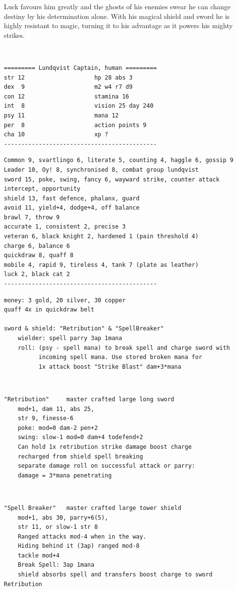 Luck favours him greatly and the ghosts of his enemies swear he can change destiny by his determination alone. With his magical shield and sword he is highly resistant to magic, turning it to his advantage as it powers his mighty strikes.


\

\goodbreak \small \begin{samepage} \begin{verbatim}
========= Lundqvist Captain, human =========
str 12                    hp 28 abs 3
dex  9                    m2 w4 r7 d9
con 12                    stamina 16
int  8                    vision 25 day 240
psy 11                    mana 12
per  8                    action points 9
cha 10                    xp ?
--------------------------------------------
\end{verbatim} \goodbreak \begin{verbatim}
Common 9, svartlingo 6, literate 5, counting 4, haggle 6, gossip 9
Leader 10, Oy! 8, synchronised 8, combat group lundqvist
sword 15, poke, swing, fancy 6, wayward strike, counter attack
intercept, opportunity
shield 13, fast defence, phalanx, guard
avoid 11, yield+4, dodge+4, off balance
brawl 7, throw 9
accurate 1, consistent 2, precise 3
veteran 6, black knight 2, hardened 1 (pain threshold 4)
charge 6, balance 6
quickdraw 8, quaff 8
mobile 4, rapid 9, tireless 4, tank 7 (plate as leather)
luck 2, black cat 2
--------------------------------------------
\end{verbatim} \goodbreak \begin{verbatim}
money: 3 gold, 20 silver, 30 copper
quaff 4x in quickdraw belt

sword & shield: "Retribution" & "SpellBreaker"
    wielder: spell parry 3ap 1mana
    roll: (psy - spell mana) to break spell and charge sword with
          incoming spell mana. Use stored broken mana for
          1x attack boost "Strike Blast" dam+3*mana
\end{verbatim} \end{samepage}   \   \goodbreak \begin{samepage} \begin{verbatim}
"Retribution"     master crafted large long sword
    mod+1, dam 11, abs 25,
    str 9, finesse-6
    poke: mod=0 dam-2 pen+2
    swing: slow-1 mod=0 dam+4 todefend+2
    Can hold 1x retribution strike damage boost charge
    recharged from shield spell breaking
    separate damage roll on successful attack or parry:
    damage = 3*mana penetrating
\end{verbatim} \end{samepage}   \   \goodbreak \begin{samepage} \begin{verbatim}
"Spell Breaker"   master crafted large tower shield
    mod+1, abs 30, parry+6(5),
    str 11, or slow-1 str 8
    Ranged attacks mod-4 when in the way.
    Hiding behind it (3ap) ranged mod-8
    tackle mod+4
    Break Spell: 3ap 1mana
    shield absorbs spell and transfers boost charge to sword Retribution


\end{verbatim}
\end{samepage}
